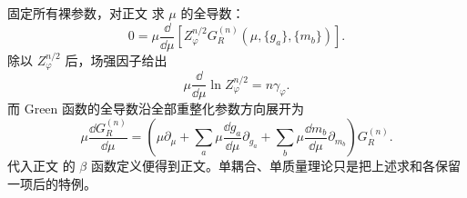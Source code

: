 \begin{derivation}

固定所有裸参数，对正文 求 $\mu$ 的全导数：
\begin{equation*}
 0=\mu\frac{\dd}{\dd\mu}
 \left[Z_\varphi^{n/2}G_R^{(n)}(\mu,\{g_a\},\{m_b\})\right].
\end{equation*}
除以 $Z_\varphi^{n/2}$ 后，场强因子给出
\begin{equation*}
 \mu\frac{\dd}{\dd\mu}\ln Z_\varphi^{n/2}
 =n\gamma_\varphi.
\end{equation*}
而 Green 函数的全导数沿全部重整化参数方向展开为
\begin{equation*}
 \mu\frac{\dd G_R^{(n)}}{\dd\mu}
 =\left(
 \mu\partial_\mu
 +\sum_a\mu\frac{\dd g_a}{\dd\mu}\partial_{g_a}
 +\sum_b\mu\frac{\dd m_b}{\dd\mu}\partial_{m_b}
 \right)G_R^{(n)}.
\end{equation*}
代入正文 的 $\beta$ 函数定义便得到正文。单耦合、单质量理论只是把上述求和各保留一项后的特例。
\end{derivation}

